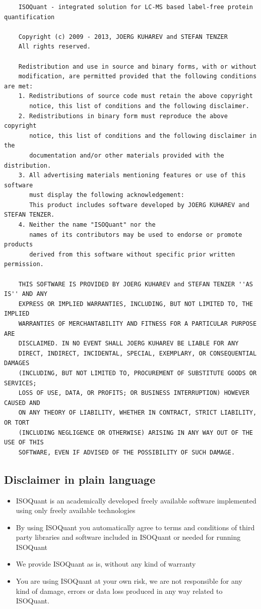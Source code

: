 \documentclass[]{article}
\providecommand{\tightlist}{%
  \setlength{\itemsep}{0pt}\setlength{\parskip}{0pt}}
\begin{document}
\begin{lstlisting}
    ISOQuant - integrated solution for LC-MS based label-free protein quantification

    Copyright (c) 2009 - 2013, JOERG KUHAREV and STEFAN TENZER
    All rights reserved.

    Redistribution and use in source and binary forms, with or without
    modification, are permitted provided that the following conditions are met:
    1. Redistributions of source code must retain the above copyright
       notice, this list of conditions and the following disclaimer.
    2. Redistributions in binary form must reproduce the above copyright
       notice, this list of conditions and the following disclaimer in the
       documentation and/or other materials provided with the distribution.
    3. All advertising materials mentioning features or use of this software
       must display the following acknowledgement:
       This product includes software developed by JOERG KUHAREV and STEFAN TENZER.
    4. Neither the name "ISOQuant" nor the
       names of its contributors may be used to endorse or promote products
       derived from this software without specific prior written permission.

    THIS SOFTWARE IS PROVIDED BY JOERG KUHAREV and STEFAN TENZER ''AS IS'' AND ANY
    EXPRESS OR IMPLIED WARRANTIES, INCLUDING, BUT NOT LIMITED TO, THE IMPLIED
    WARRANTIES OF MERCHANTABILITY AND FITNESS FOR A PARTICULAR PURPOSE ARE
    DISCLAIMED. IN NO EVENT SHALL JOERG KUHAREV BE LIABLE FOR ANY
    DIRECT, INDIRECT, INCIDENTAL, SPECIAL, EXEMPLARY, OR CONSEQUENTIAL DAMAGES
    (INCLUDING, BUT NOT LIMITED TO, PROCUREMENT OF SUBSTITUTE GOODS OR SERVICES;
    LOSS OF USE, DATA, OR PROFITS; OR BUSINESS INTERRUPTION) HOWEVER CAUSED AND
    ON ANY THEORY OF LIABILITY, WHETHER IN CONTRACT, STRICT LIABILITY, OR TORT
    (INCLUDING NEGLIGENCE OR OTHERWISE) ARISING IN ANY WAY OUT OF THE USE OF THIS
    SOFTWARE, EVEN IF ADVISED OF THE POSSIBILITY OF SUCH DAMAGE.
\end{lstlisting}

\subsection{Disclaimer in plain
language}\label{disclaimer-in-plain-language}

\begin{itemize}
\tightlist
\item
  ISOQuant is an academically developed freely available software
  implemented using only freely available technologies
\item
  By using ISOQuant you automatically agree to terms and conditions of
  third party libraries and software included in ISOQuant or needed for
  running ISOQuant
\item
  We provide ISOQuant as is, without any kind of warranty
\item
  You are using ISOQuant at your own risk, we are not responsible for
  any kind of damage, errors or data loss produced in any way related to
  ISOQuant.
\end{itemize}
\end{document}
